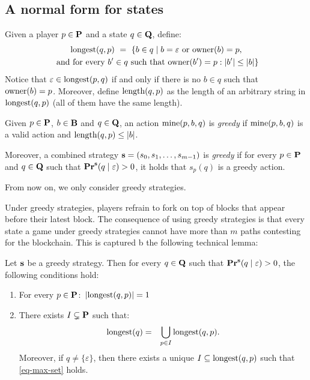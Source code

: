  
 \subsection{A normal form for states}
Given a player $p \in \mathbf{P}$ and a state $q \in \mathbf{Q}$, define:
\begin{multline*}
{\text{\rm longest}}(q,p) \ = \ \{ b \in q \mid b = \varepsilon \text{ or } \text{\rm owner}(b) = p,\\
\text{ and for every } b' \in q \text{ such that } \text{\rm owner}(b') = p : |b'| \leq |b|\}
\end{multline*}
Notice that $\varepsilon \in {\text{\rm longest}}(p,q)$ if and only if there is no $b \in q$ such that $\text{\rm owner}(b) = p$. Moreover, define $\text{\rm length}(q,p)$ as the length of an arbitrary string in ${\text{\rm longest}}(q,p)$ (all of them have the same length).
\begin{mydef}\label{def-greedy}
Given $p \in \mathbf{P}$, $b \in \mathbf{B}$ and $q \in \mathbf{Q}$,  an action $\text{\rm mine}(p,b,q)$ is {\em greedy} if $\text{\rm mine}(p,b,q)$ is a valid action and $\text{\rm length}(q,p) \leq |b|$.

Moreover, a combined strategy $\mathbf{s} = (s_0, s_1, \ldots, s_{m-1})$ is {\em greedy} if for every $p \in \mathbf{P}$ and  $q \in \mathbf{Q}$ such that $\mathbf{Pr}^{\mathbf{s}}(q \mid \varepsilon) > 0$, it holds that $s_p(q)$ is a greedy action.
\end{mydef}
From now on, we only consider greedy strategies. 

Under greedy strategies, players refrain to fork on top of blocks that appear before their latest block.
The consequence of using 
greedy strategies is that every state a game under greedy strategies cannot have more than $m$ paths contesting for the blockchain. This is captured b the following 
technical lemma: 
\begin{mylem}\label{lem-length-greedy}
Let $\mathbf{s}$ be a greedy strategy. Then for every $q \in \mathbf{Q}$ such that $\mathbf{Pr}^{\mathbf{s}}(q \mid \varepsilon) > 0$, the following conditions hold:
\begin{enumerate}
\item For every $p \in \mathbf{P}$$:$ $|{\text{\rm longest}}(q,p)| = 1$ 

\item There exists $I \subsetneq \mathbf{P}$ such that$:$
\begin{eqnarray}\label{eq-max-set}
{\text{\rm longest}}(q) & = & \bigcup_{p \in I} {\text{\rm longest}}(q,p).
\end{eqnarray}
Moreover, if $q \neq \{\varepsilon\}$, then there exists a unique $I \subseteq {\text{\rm longest}}(q,p)$ such that \eqref{eq-max-set} holds.
\end{enumerate}
\end{mylem}

